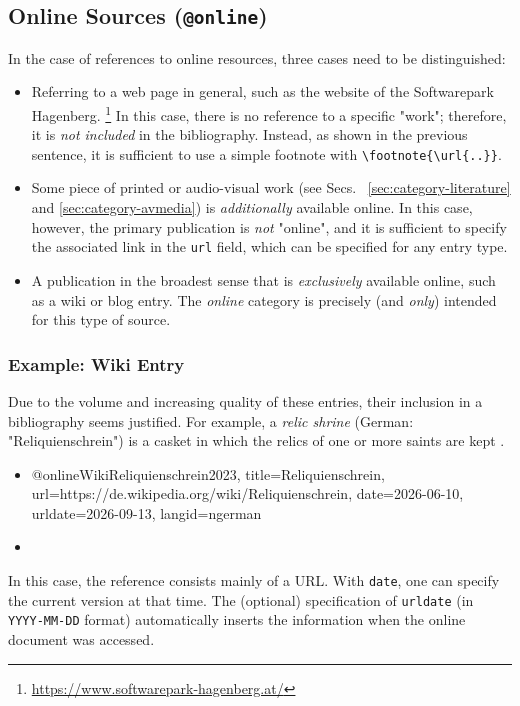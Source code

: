\subsection{Online Sources (\texttt{\bfseries @online})}
\label{sec:category-online}

In the case of references to online resources, three cases need to be
distinguished:
%
\begin{itemize}
    \item[A.] Referring to a web page in general, such as the website of the
    Softwarepark Hagenberg.%
    \footnote{\url{https://www.softwarepark-hagenberg.at/}}
    In this case, there is no reference to a specific "work"; therefore, it is
    \emph{not included} in the bibliography. Instead, as shown in the previous
    sentence, it is sufficient to use a simple footnote with
    \verb!\footnote{\url{..}}!.
%
    \item[B.] Some piece of printed or audio-visual work (see Secs.~%
    \ref{sec:category-literature} and \ref{sec:category-avmedia}) is
    \emph{additionally} available online. In this case, however, the primary
    publication is \emph{not} "online", and it is sufficient to specify the
    associated link in the \texttt{url} field, which can be specified for any
    entry type.
%
    \item[C.] A publication in the broadest sense that is
    \emph{exclusively} available online, such as a wiki or blog entry. The \emph{online} category
    is precisely (and \emph{only}) intended for this type of source.
\end{itemize}

\subsubsection{Example: Wiki Entry}
\label{sec:@online-www}

Due to the volume and increasing quality of these entries, their inclusion in
a bibliography seems justified. For example, a \emph{relic shrine} (German:
"Reliquienschrein") is a casket in which the relics of one or more saints are
kept \cite{WikiReliquienschrein2023}.
%
\begin{itemize}
\item[]
\begin{GenericCode}[numbers=none]
@online{WikiReliquienschrein2023,
  title={Reliquienschrein},
  url={https://de.wikipedia.org/wiki/Reliquienschrein},
  date={2026-06-10},
  urldate={2026-09-13},
  langid={ngerman}
}
\end{GenericCode}
\item[\cite{WikiReliquienschrein2023}] \begin{sloppypar}\end{sloppypar}
\end{itemize}
%
In this case, the reference consists mainly of a URL. With \texttt{date}, one
can specify the current version at that time. The (optional) specification of
\texttt{urldate} (in \texttt{YYYY-MM-DD} format) automatically inserts the
information when the online document was accessed.


